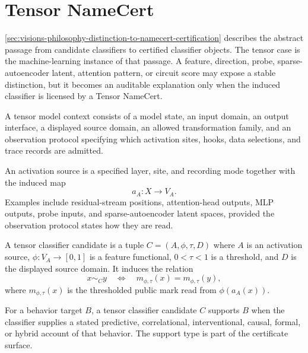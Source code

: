\section{Tensor NameCert}
\label{sec:visions-philosophy-tensor-namecert}

\autoref{sec:visions-philosophy-distinction-to-namecert-certification}
describes the abstract passage from candidate classifiers to certified
classifier objects. The tensor case is the machine-learning instance of
that passage. A feature, direction, probe, sparse-autoencoder latent,
attention pattern, or circuit score may expose a stable distinction, but
it becomes an auditable explanation only when the induced classifier is
licensed by a Tensor NameCert.

\begin{definition}
\label{def:philosophy-tensor-model-context}
A tensor model context consists of a model state, an input domain, an
output interface, a displayed source domain, an allowed transformation
family, and an observation protocol specifying which activation sites,
hooks, data selections, and trace records are admitted.
\end{definition}

\begin{definition}
\label{def:philosophy-activation-source}
An activation source is a specified layer, site, and recording mode
together with the induced map
$$
a_A:X\to V_A.
$$
Examples include residual-stream positions, attention-head outputs, MLP
outputs, probe inputs, and sparse-autoencoder latent spaces, provided
the observation protocol states how they are read.
\end{definition}

\begin{definition}
\label{def:philosophy-tensor-classifier-candidate}
A tensor classifier candidate is a tuple $C=(A,\phi,\tau,D)$ where $A$
is an activation source, $\phi:V_A\to[0,1]$ is a feature functional,
$0<\tau<1$ is a threshold, and $D$ is the displayed source domain. It
induces the relation
$$
x\sim_C y
\quad\Longleftrightarrow\quad
m_{\phi,\tau}(x)=m_{\phi,\tau}(y),
$$
where $m_{\phi,\tau}(x)$ is the thresholded public mark read from
\(\phi(a_A(x))\).
\end{definition}

\begin{definition}
\label{def:philosophy-tensor-behavior-support}
For a behavior target $B$, a tensor classifier candidate $C$ supports
$B$ when the classifier supplies a stated predictive, correlational,
interventional, causal, formal, or hybrid account of that behavior. The
support type is part of the certificate surface.
\end{definition}

